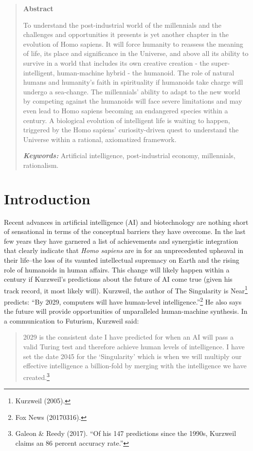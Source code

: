 \begin{multicols}{2}

\begin{quotation}
\centerline{\bf Abstract}
\medskip

\noindent
To understand the post-industrial world of the millennials and the challenges and opportunities it presents is yet another chapter in the evolution of Homo sapiens. It will force humanity to reassess the meaning of life, its place and significance in the Universe, and above all its ability to survive in a world that includes its own creative creation - the super-intelligent, human-machine hybrid - the humanoid. The role of natural humans and humanity's faith in spirituality if humanoids take charge will undergo a sea-change. The millennials' ability to adapt to the new world by competing against the humanoids will face severe limitations and may even lead to Homo sapiens becoming an endangered species within a century. A biological evolution of intelligent life is waiting to happen, triggered by the Homo sapiens’ curiosity-driven quest to understand the Universe within a rational, axiomatized framework.

\smallskip
\noindent
{\it\bfseries Keywords:} Artificial intelligence, post-industrial economy, millennials, rationalism.
\end{quotation}

\section{Introduction}

Recent advances in artificial intelligence (AI) and biotechnology are nothing short of sensational in terms of the conceptual barriers they have overcome. In the last few years they have garnered a list of achievements and synergistic integration that clearly indicate that \textit{Homo sapiens} are in for an unprecedented upheaval in their life--the loss of its vaunted intellectual supremacy on Earth and the rising role of humanoids in human affairs. This change will likely happen within a century if Kurzweil's predictions about the future of AI come true (given his track record, it most likely will). Kurzweil, the author of The Singularity is Near\footnote{Kurzweil (2005).} predicts: “By 2029, computers will have human-level intelligence.”\footnote{Fox News (20170316).} He also says the future will provide opportunities of unparalleled human-machine synthesis. In a communication to Futurism, Kurzweil said:
\begin{quote}
2029 is the consistent date I have predicted for when an AI will pass a valid Turing test and therefore achieve human levels of intelligence. I have set the date 2045 for the `Singularity' which is when we will multiply our effective intelligence a billion-fold by merging with the intelligence we have created.\footnote{Galeon \& Reedy (2017). “Of his 147 predictions since the 1990s, Kurzweil claims an 86 percent accuracy rate.”}
\end{quote}


\end{multicols}

